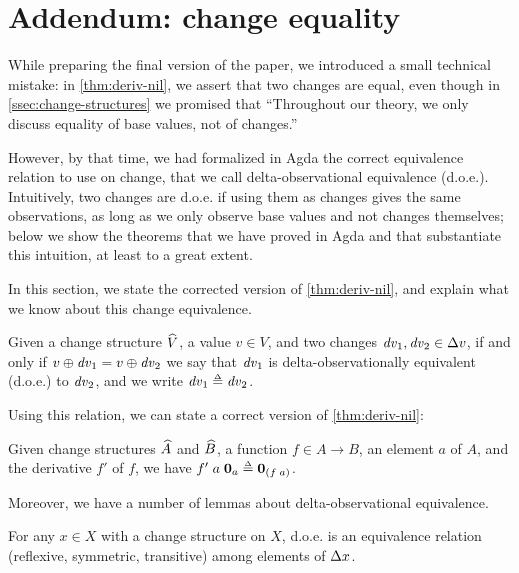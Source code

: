 \section{Addendum: change equality}
\label{sec:change-eq}

While preparing the final version of the paper, we introduced a
small technical mistake: in \cref{thm:deriv-nil}, we assert that
two changes are equal, even though in
\cref{ssec:change-structures} we promised that ``Throughout
our theory, we only discuss equality of base values, not of
changes.''

However, by that time, we had formalized in Agda the correct
equivalence relation to use on change, that we call
delta-observational equivalence (d.o.e.). Intuitively, two
changes are d.o.e. if using them as changes gives the same
observations, as long as we only observe base values and not
changes themselves; below we show the theorems that we have
proved in Agda and that substantiate this intuition, at least to
a great extent.

In this section, we
state the corrected version of \cref{thm:deriv-nil}, and explain
what we know about this change equivalence.

\begin{definition}
  Given a change structure $\widehat{V}$, a value $v \in V$,
  and two changes $\D v_1, \D v_2 \in \Change{v}$, if and only if
  $\Update{v}{\D v_1} = \Update{v}{\D v_2}$ we say that $\mathit{dv}_1$
  is delta-observationally equivalent (d.o.e.) to $\mathit{dv}_2$, and
  we write $\D v_1 \Doe \D v_2$.
\end{definition}

Using this relation, we can state a correct version of
\cref{thm:deriv-nil}:

\begin{lemma}
  \label{thm:deriv-nil-2}
  Given change structures $\widehat{A}$ and
  $\widehat{B}$, a function $f \in A \to B$, an element $a$
  of $A$, and the derivative $f'$ of $f$, we have
  $\App{\App{f'}{a}}{\NilC{a}} \Doe \NilC{\App* f a}$.
\end{lemma}

Moreover, we have a number of lemmas about delta-observational
equivalence.


\begin{lemma}[D.o.e. is an equivalence]
  For any $x \in X$ with a change structure on $X$, d.o.e. is an
  equivalence relation (reflexive, symmetric, transitive) among
  elements of $\Change{x}$.
\end{lemma}

